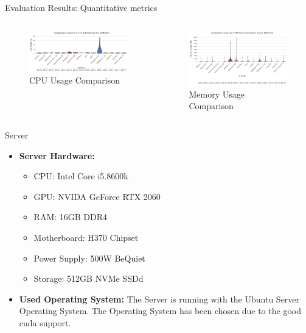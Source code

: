 \documentclass{beamer}
\begin{document}
\begin{frame}{Evaluation Results: Quantitative metrics}
  \begin{columns}[t]
      \begin{figure}
        \centering
        \includegraphics[width=0.9\columnwidth]{model_cpu_usage_comparison.png}
        \caption{CPU Usage Comparison}
        \label{fig:cpu-usage}
      \end{figure}
      \begin{figure}
        \centering
        \includegraphics[width=0.9\columnwidth]{model_memory_usage_comparison.png}
        \caption{Memory Usage Comparison}
        \label{fig:memory-usage}
      \end{figure}
  \end{columns}
\end{frame}


\begin{frame}{Server}
  \begin{itemize}
    \item \textbf{Server Hardware:}
      \begin{itemize}
        \item CPU: Intel Core i5.8600k
        \item GPU: NVIDA GeForce RTX 2060
        \item RAM: 16GB DDR4 
        \item Motherboard: H370 Chipset
        \item Power Supply: 500W BeQuiet
        \item Storage: 512GB NVMe SSDd
      \end{itemize}
    \item \textbf{Used Operating System:} The Server is running with the Ubuntu Server Operating System. The Operating System has been chosen due to the good cuda support. 

  \end{itemize}
\end{frame}
\end{document}
